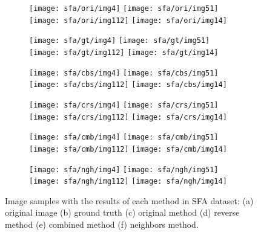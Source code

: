 \begin{figure*}[!htb]
    \centering
    \begin{subfigure}[t]{0.15\textwidth}
        \texttt{[image: sfa/ori/img4]}
        \texttt{[image: sfa/ori/img51]}
        \texttt{[image: sfa/ori/img112]}
        \texttt{[image: sfa/ori/img14]}
        \caption{}
    \end{subfigure}
    \begin{subfigure}[t]{0.15\textwidth}
        \texttt{[image: sfa/gt/img4]}
        \texttt{[image: sfa/gt/img51]}
        \texttt{[image: sfa/gt/img112]}
        \texttt{[image: sfa/gt/img14]}
        \caption{}
    \end{subfigure}
    \begin{subfigure}[t]{0.15\textwidth}
        \texttt{[image: sfa/cbs/img4]}
        \texttt{[image: sfa/cbs/img51]}
        \texttt{[image: sfa/cbs/img112]}
        \texttt{[image: sfa/cbs/img14]}
        \caption{}
    \end{subfigure}
    \begin{subfigure}[t]{0.15\textwidth}
        \texttt{[image: sfa/crs/img4]}
        \texttt{[image: sfa/crs/img51]}
        \texttt{[image: sfa/crs/img112]}
        \texttt{[image: sfa/crs/img14]}
        \caption{}
    \end{subfigure}
    \begin{subfigure}[t]{0.15\textwidth}
        \texttt{[image: sfa/cmb/img4]}
        \texttt{[image: sfa/cmb/img51]}
        \texttt{[image: sfa/cmb/img112]}
        \texttt{[image: sfa/cmb/img14]}
        \caption{}
    \end{subfigure}
    \begin{subfigure}[t]{0.15\textwidth}
        \texttt{[image: sfa/ngh/img4]}
        \texttt{[image: sfa/ngh/img51]}
        \texttt{[image: sfa/ngh/img112]}
        \texttt{[image: sfa/ngh/img14]}
        \caption{}
    \end{subfigure}

    \caption[Image samples with the results of each method in SFA dataset]{Image samples with the results of each method in SFA dataset: (a) original image (b) ground truth (c) original method \cite{brancati:17} (d) reverse method (e) combined method (f) neighbors method.}
    \label{fig:results_sfa}
\end{figure*}

